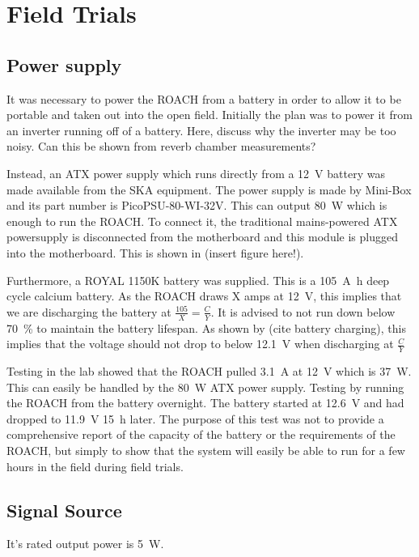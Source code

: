 \chapter{Field Trials}
\label{ch:field-trials}

\section{Power supply}
It was necessary to power the ROACH from a battery in order to allow it to be portable and taken out into the open field.
Initially the plan was to power it from an inverter running off of a battery. Here, discuss why the inverter may be too noisy. Can this be shown from reverb chamber measurements?

Instead, an ATX power supply which runs directly from a \SI{12}{\volt} battery was made available from the SKA equipment. The power supply is made by Mini-Box and its part number is PicoPSU-80-WI-32V. This can output \SI{80}{\watt} which is enough to run the ROACH. To connect it, the traditional mains-powered ATX powersupply is disconnected from the motherboard and this module is plugged into the motherboard. This is shown in (insert figure here!).

Furthermore, a ROYAL 1150K battery was supplied. This is a \SI{105}{\ampere\hour} deep cycle calcium battery.
As the ROACH draws X amps at \SI{12}{\volt}, this implies that we are discharging the battery at \(\frac{105}{X} = \frac{C}{Y}\).
It is advised to not run down below \SI{70}{\percent} to maintain the battery lifespan. As shown by (cite battery charging), this implies that the voltage should not drop to below \SI{12.1}{\volt} when discharging at \(\frac{C}{Y}\)

Testing in the lab showed that the ROACH pulled \SI{3.1}{\ampere} at \SI{12}{\volt} which is \SI{37}{\watt}. This can easily be handled by the \SI{80}{\watt} ATX power supply. 
Testing by running the ROACH from the battery overnight. The battery started at \SI{12.6}{\volt} and had dropped to \SI{11.9}{\volt} \SI{15}{\hour} later. The purpose of this test was not to provide a comprehensive report of the capacity of the battery or the requirements of the ROACH, but simply to show that the system will easily be able to run for a few hours in the field during field trials.

\section{Signal Source}
It's rated output power is \SI{5}{\watt}. 



